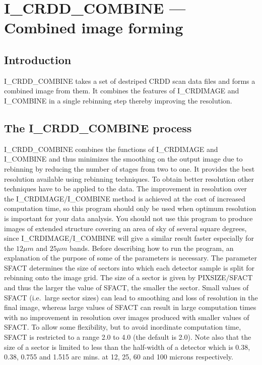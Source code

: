 \documentclass[nolof,noabs,11pt]{starlink}
\begin{document}
\section{I\_CRDD\_COMBINE --- Combined image forming}

\subsection {Introduction}

I\_CRDD\_COMBINE takes a set of destriped CRDD scan data files and forms a
combined image from them. It combines the features of I\_CRDIMAGE and I\_COMBINE
in a single rebinning step thereby improving the resolution.

\subsection {The I\_CRDD\_COMBINE process}

    I\_CRDD\_COMBINE combines the functions of I\_CRDIMAGE and I\_COMBINE and
thus minimizes the smoothing on the output image due to rebinning by reducing
the number of stages from two to one. It provides the best
resolution available using rebinning techniques. To obtain
better resolution other techniques have to be applied to the data. The
improvement in resolution over the I\_CRDIMAGE/I\_COMBINE method is achieved at
the cost of increased computation time, so this program should only be used when
optimum resolution is important for your data analysis. You should not use
this program to produce images of extended structure covering an area of
sky of several square degrees, since I\_CRDIMAGE/I\_COMBINE will give a similar
result faster especially for the $12\mu m$ and $25\mu m$ bands.
   Before describing how to run the program, an explanation of the purpose of
some of the parameters is necessary. The parameter SFACT determines the size of
sectors into which each detector sample is split for rebinning onto the image
grid. The size of a sector is given by PIXSIZE/SFACT and thus the larger the
value of SFACT, the smaller the sector. Small values of SFACT (i.e.\ large
sector sizes) can lead to smoothing and loss of resolution in the final image,
whereas large values of SFACT can result in large computation times with no
improvement in resolution over images produced with smaller values of SFACT.
To allow some flexibility, but to avoid inordinate computation time, SFACT is
restricted to a range 2.0 to 4.0 (the default is 2.0). Note also that the size
of a sector is limited to less than the half-width of a detector which is
0.38, 0.38, 0.755 and 1.515 arc mins. at 12, 25, 60 and 100 microns
respectively.
\end{document}
